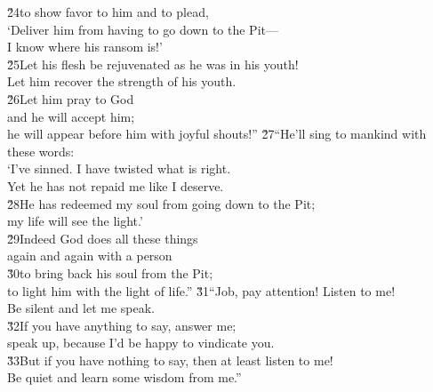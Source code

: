\begin{poetry}
\poeml \v{24}to show favor to him and to plead, \\
\poemll    `Deliver him from having to go down to the Pit--- \\
\poemlll       I know where his ransom is!' \\
\poeml \v{25}Let his flesh be rejuvenated as he was in his youth! \\
\poemll    Let him recover the strength of his youth. \\
\poeml \v{26}Let him pray to God \\
\poemll    and he will accept him; \\
\poemlll       he will appear before him with joyful shouts!''
\poeml \v{27}``He'll sing to mankind with these words: \\
\poeml `I've sinned. I have twisted what is right. \\
\poemll    Yet he has not repaid me like I deserve. \\
\poeml \v{28}He has redeemed my soul from going down to the Pit; \\
\poemll    my life will see the light.' \\
\poeml \v{29}Indeed God does all these things \\
\poemll    again and again with a person \\
\poeml \v{30}to bring back his soul from the Pit; \\
\poemll    to light him with the light of life.''
\poeml \v{31}``Job, pay attention! Listen to me! \\
\poemll    Be silent and let me speak. \\
\poeml \v{32}If you have anything to say, answer me; \\
\poemll    speak up, because I'd be happy to vindicate you. \\
\poeml \v{33}But if you have nothing to say, then at least listen to me! \\
\poemll    Be quiet and learn some wisdom from me.''
\end{poetry}

